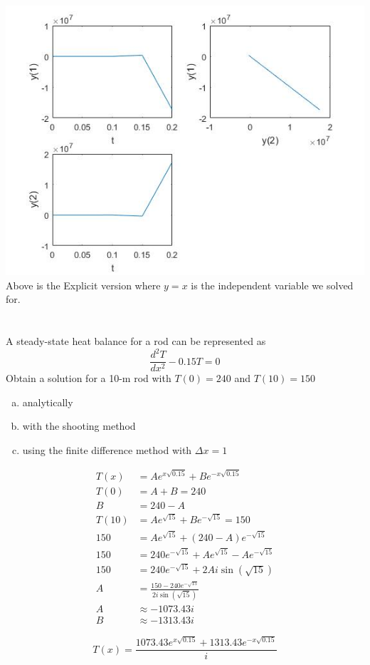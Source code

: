 \documentclass{article}
\begin{document}
\includegraphics[width=\linewidth]{HW11-ODEsysEx.jpg}
Above is the Explicit version where $y=x$ is the independent variable we solved for.


\section{}

\begin{problem}
A steady-state heat balance for a rod can be represented as
\[ \frac{d^{2}T}{dx^{2}} -0.15T = 0 \]
Obtain a solution for a 10-m rod with $T(0)=240$ and $T(10)=150$
\begin{enumerate}[(a)]
\item analytically
\item with the shooting method
\item using the finite difference method with $\Delta x = 1$
\end{enumerate}
\end{problem}

\begin{solution}
\begin{align*}
T(x) &= Ae^{x\sqrt{0.15}} + Be^{-x\sqrt{0.15}}\\
T(0) &= A+B = 240\\
B &= 240-A\\
T(10) &= Ae^{\sqrt{15}} + Be^{-\sqrt{15}} = 150\\
150 &= Ae^{\sqrt{15}} + (240-A)e^{-\sqrt{15}}\\
150 &= 240e^{-\sqrt{15}} +Ae^{\sqrt{15}} -Ae^{-\sqrt{15}}\\
150 &= 240e^{-\sqrt{15}} +2Ai\sin(\sqrt{15})\\
A &= \frac{150 -240e^{-\sqrt{15}}}{2i\sin(\sqrt{15})}\\
A &\approx -1073.43 i\\
B &\approx -1313.43 i
\end{align*}

\[ T(x) = \frac{1073.43 e^{x\sqrt{0.15}} + 1313.43e^{-x\sqrt{0.15}}}{i} \]
\end{solution}
\end{document}
